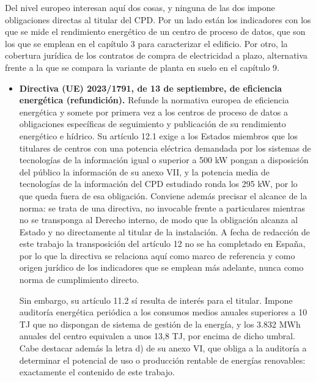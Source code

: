 Del nivel europeo interesan aquí dos cosas, y ninguna de las dos impone obligaciones directas al titular del \ac{CPD}. Por un lado están los indicadores con los que se mide el rendimiento energético de un centro de proceso de datos, que son los que se emplean en el capítulo 3 para caracterizar el edificio. Por otro, la cobertura jurídica de los contratos de compra de electricidad a plazo, alternativa frente a la que se compara la variante de planta en suelo en el capítulo 9.

\begin{itemize}
    \item \textbf{Directiva (UE) 2023/1791, de 13 de septiembre, de eficiencia energética (refundición).} Refunde la normativa europea de eficiencia energética y somete por primera vez a los centros de proceso de datos a obligaciones específicas de seguimiento y publicación de su rendimiento energético e hídrico. Su artículo 12.1 exige a los Estados miembros que los titulares de centros con una potencia eléctrica demandada por los sistemas de tecnologías de la información igual o superior a 500 kW pongan a disposición del público la información de su anexo VII, y la potencia media de tecnologías de la información del \ac{CPD} estudiado ronda los 295 kW, por lo que queda fuera de esa obligación. Conviene además precisar el alcance de la norma: se trata de una directiva, no invocable frente a particulares mientras no se transponga al Derecho interno, de modo que la obligación alcanza al Estado y no directamente al titular de la instalación. A fecha de redacción de este trabajo la transposición del artículo 12 no se ha completado en España, por lo que la directiva se relaciona aquí como marco de referencia y como origen jurídico de los indicadores que se emplean más adelante, nunca como norma de cumplimiento directo.

    Sin embargo, su artículo 11.2 sí resulta de interés para el titular. Impone auditoría energética periódica a los consumos medios anuales superiores a 10 TJ que no dispongan de sistema de gestión de la energía, y los 3.832 MWh anuales del centro equivalen a unos 13,8 TJ, por encima de dicho umbral. Cabe destacar además la letra d) de su anexo VI, que obliga a la auditoría a determinar el potencial de uso o producción rentable de energías renovables: exactamente el contenido de este trabajo.


\end{itemize}
